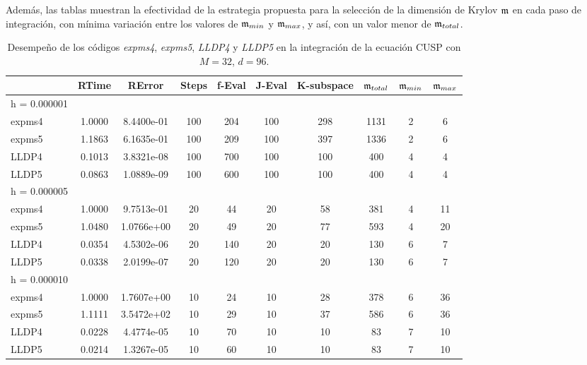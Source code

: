 Además, las tablas muestran la efectividad de la estrategia propuesta para la selección de la dimensión de Krylov $\mathfrak{m}$ en cada paso de integración, con mínima variación entre los valores de $\mathfrak{m}_{min}$ y $\mathfrak{m}_{max}$, y así, con un valor menor de $\mathfrak{m}_{total}$.

\begin{table}[htb]
	\caption{Desempeño de los códigos \emph{expms4}, \emph{expms5}, \emph{LLDP4} y \emph{LLDP5} en la integración de la ecuación CUSP con $M=32$, $d=96$.}
	\centering
		\begin{tabular}{lccccccccc}
			\hline
			& RTime & RError & Steps & f-Eval & J-Eval & K-subspace & $\mathfrak{m}_{total}$ & $\mathfrak{m}_{min}$ & $\mathfrak{m}_{max}$ \\
			\hline
			h = 0.000001 &  &  &  &  &  &  &  &  &  \\
			expms4 & 1.0000 & 8.4400e-01 & 100 & 204 & 100 & 298 & 1131 & 2 & 6  \\
			expms5 & 1.1863 & 6.1635e-01 & 100 & 209 & 100 & 397 & 1336 & 2 & 6  \\
			LLDP4 & 0.1013 & 3.8321e-08 & 100 & 700 & 100 & 100 & 400 & 4 & 4  \\
			LLDP5 & 0.0863 & 1.0889e-09 & 100 & 600 & 100 & 100 & 400 & 4 & 4  \\
			\hline
			h = 0.000005 &  &  &  &  &  &  &  &  &  \\
			expms4 & 1.0000 & 9.7513e-01 & 20 & 44 & 20 & 58 & 381 & 4 & 11  \\
			expms5 & 1.0480 & 1.0766e+00 & 20 & 49 & 20 & 77 & 593 & 4 & 20  \\
			LLDP4 & 0.0354 & 4.5302e-06 & 20 & 140 & 20 & 20 & 130 & 6 & 7  \\
			LLDP5 & 0.0338 & 2.0199e-07 & 20 & 120 & 20 & 20 & 130 & 6 & 7  \\
			\hline
			h = 0.000010 &  &  &  &  &  &  &  &  &  \\
			expms4 & 1.0000 & 1.7607e+00 & 10 & 24 & 10 & 28 & 378 & 6 & 36  \\
			expms5 & 1.1111 & 3.5472e+02 & 10 & 29 & 10 & 37 & 586 & 6 & 36  \\
			LLDP4 & 0.0228 & 4.4774e-05 & 10 & 70 & 10 & 10 & 83 & 7 & 10  \\
			LLDP5 & 0.0214 & 1.3267e-05 & 10 & 60 & 10 & 10 & 83 & 7 & 10  \\
			\hline
		\end{tabular}
	\label{tab:num-exp-lldp-fix-step:cpna}
\end{table}



